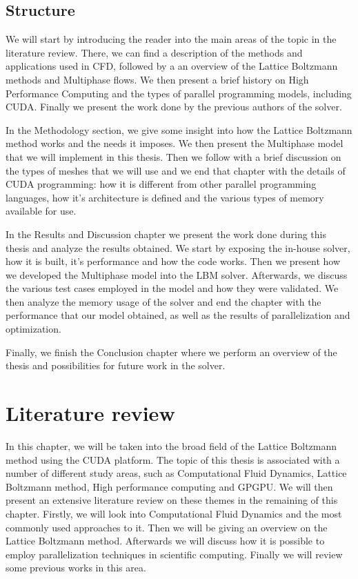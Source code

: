 \documentclass[12pt, openany]{book}
\begin{document}
\section{Structure}
We will start by introducing the reader into the main areas of the topic in the literature review. There, we can find a description of the methods and applications used in CFD, followed by a an overview of the Lattice Boltzmann methods and Multiphase flows. We then present a brief history on High Performance Computing and the types of parallel programming models, including CUDA. Finally we present the work done by the previous authors of the solver.\par
In the Methodology section, we give some insight into how the Lattice Boltzmann method works and the needs it imposes. We then present the Multiphase model that we will implement in this thesis. Then we follow with a brief discussion on the types of meshes that we will use and we end that chapter with the details of CUDA programming: how it is different from other parallel programming languages, how it's architecture is defined and the various types of memory available for use.\par
In the Results and Discussion chapter we present the work done during this thesis and analyze the results obtained. We start by exposing the in-house solver, how it is built, it's performance and how the code works. Then we present how we developed the Multiphase model into the LBM solver. Afterwards, we discuss the various test cases employed in the model and how they were validated. We then analyze the memory usage of the solver and end the chapter with the performance that our model obtained, as well as the results of parallelization and optimization.\par
Finally, we finish the Conclusion chapter where we perform an overview of the thesis and possibilities for future work in the solver.
\chapter{Literature review}
In this chapter, we will be taken into the broad field of the Lattice Boltzmann method using the CUDA platform. The topic of this thesis is associated with a number of different study areas, such as Computational Fluid Dynamics, Lattice Boltzmann method, High performance computing and GPGPU. We will then present an extensive literature review on these themes in the remaining of this chapter. Firstly, we will look into Computational Fluid Dynamics and the most commonly used approaches to it. Then we will be giving an overview on the Lattice Boltzmann method. Afterwards we will discuss how it is possible to employ parallelization techniques in scientific computing. Finally we will review some previous works in this area.
\end{document}
